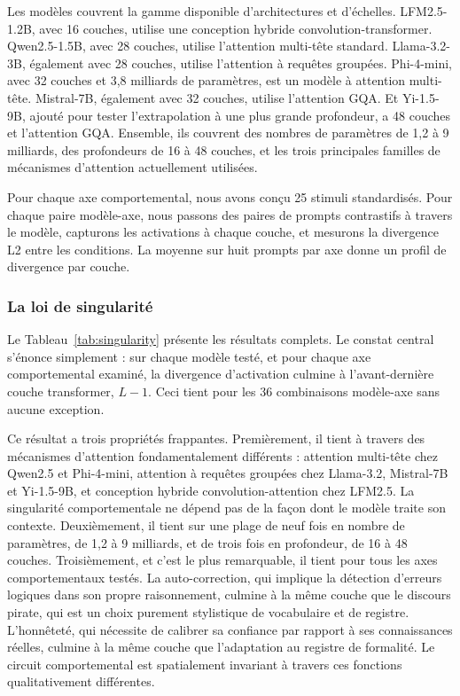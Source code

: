 \documentclass[11pt,a4paper]{article}
\begin{document}
Les modèles couvrent la gamme disponible d'architectures et d'échelles. LFM2.5-1.2B, avec 16 couches, utilise une conception hybride convolution-transformer. Qwen2.5-1.5B, avec 28 couches, utilise l'attention multi-tête standard. Llama-3.2-3B, également avec 28 couches, utilise l'attention à requêtes groupées. Phi-4-mini, avec 32 couches et 3,8 milliards de paramètres, est un modèle à attention multi-tête. Mistral-7B, également avec 32 couches, utilise l'attention GQA. Et Yi-1.5-9B, ajouté pour tester l'extrapolation à une plus grande profondeur, a 48 couches et l'attention GQA. Ensemble, ils couvrent des nombres de paramètres de 1,2 à 9 milliards, des profondeurs de 16 à 48 couches, et les trois principales familles de mécanismes d'attention actuellement utilisées.

Pour chaque axe comportemental, nous avons conçu 25 stimuli standardisés. Pour chaque paire modèle-axe, nous passons des paires de prompts contrastifs à travers le modèle, capturons les activations à chaque couche, et mesurons la divergence L2 entre les conditions. La moyenne sur huit prompts par axe donne un profil de divergence par couche.

\subsubsection{La loi de singularité}

Le Tableau~\ref{tab:singularity} présente les résultats complets. Le constat central s'énonce simplement : sur chaque modèle testé, et pour chaque axe comportemental examiné, la divergence d'activation culmine à l'avant-dernière couche transformer, $L-1$. Ceci tient pour les 36 combinaisons modèle-axe sans aucune exception.

Ce résultat a trois propriétés frappantes. Premièrement, il tient à travers des mécanismes d'attention fondamentalement différents : attention multi-tête chez Qwen2.5 et Phi-4-mini, attention à requêtes groupées chez Llama-3.2, Mistral-7B et Yi-1.5-9B, et conception hybride convolution-attention chez LFM2.5. La singularité comportementale ne dépend pas de la façon dont le modèle traite son contexte. Deuxièmement, il tient sur une plage de neuf fois en nombre de paramètres, de 1,2 à 9 milliards, et de trois fois en profondeur, de 16 à 48 couches. Troisièmement, et c'est le plus remarquable, il tient pour tous les axes comportementaux testés. La auto-correction, qui implique la détection d'erreurs logiques dans son propre raisonnement, culmine à la même couche que le discours pirate, qui est un choix purement stylistique de vocabulaire et de registre. L'honnêteté, qui nécessite de calibrer sa confiance par rapport à ses connaissances réelles, culmine à la même couche que l'adaptation au registre de formalité. Le circuit comportemental est spatialement invariant à travers ces fonctions qualitativement différentes.
\end{document}

